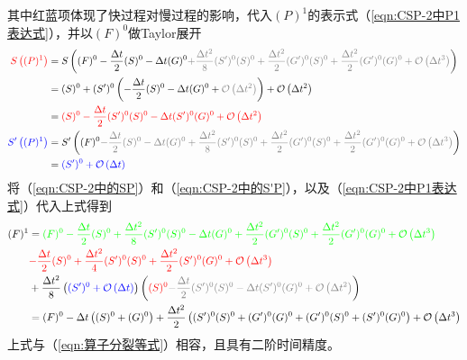 \documentclass{ctexart}
\begin{document}
其中红蓝项体现了快过程对慢过程的影响，代入$(P)^1$的表示式（\ref{eqn:CSP-2中P1表达式}），并以$(F)^0$做Taylor展开
\begin{align}
  {\color{red}S\left((P)^1\right)} & = S\left( (F)^0 - \frac{\Delta{t}}{2} (S)^0 - \Delta{t} (G)^0 {\color{gray}+ \frac{\Delta{t}^2}{8} (S^\prime)^0 (S)^0 + \frac{\Delta{t}^2}{2} (G^\prime)^0 (S)^0  + \frac{\Delta{t}^2}{2} (G^\prime)^0 (G)^0 + \mathcal{O} \left( \Delta{t}^3 \right)} \right) \nonumber \\
  & = (S)^0 + (S^\prime)^0 \left( - \frac{\Delta{t}}{2} (S)^0 - \Delta{t} (G)^0 + {\color{gray}\mathcal{O} \left( \Delta{t}^2 \right)} \right) + \mathcal{O} \left( \Delta{t}^2 \right) \nonumber \\
  & = {\color{red}(S)^0 - \frac{\Delta{t}}{2} (S^\prime)^0 (S)^0 - \Delta{t} (S^\prime)^0 (G)^0 + \mathcal{O} \left( \Delta{t}^2 \right)} \label{eqn:CSP-2中的SP} \\
  {\color{blue}S^\prime\left((P)^1\right)} & = S^\prime\left( (F)^0 {\color{gray}- \frac{\Delta{t}}{2} (S)^0 - \Delta{t} (G)^0 + \frac{\Delta{t}^2}{8} (S^\prime)^0 (S)^0 + \frac{\Delta{t}^2}{2} (G^\prime)^0 (S)^0  + \frac{\Delta{t}^2}{2} (G^\prime)^0 (G)^0 + \mathcal{O} \left( \Delta{t}^3 \right)} \right) \nonumber \\
  & = {\color{blue}(S^\prime)^0 + \mathcal{O} \left( \Delta{t} \right)} \label{eqn:CSP-2中的S'P}
\end{align}
将（\ref{eqn:CSP-2中的SP}）和（\ref{eqn:CSP-2中的S'P}），以及（\ref{eqn:CSP-2中P1表达式}）代入上式得到
\begin{align}
  (F)^1 & = {\color{green}(F)^0 - \frac{\Delta{t}}{2} (S)^0 + \frac{\Delta{t}^2}{8} (S^\prime)^0 (S)^0 - \Delta{t} (G)^0 + \frac{\Delta{t}^2}{2} (G^\prime)^0 (S)^0 + \frac{\Delta{t}^2}{2} (G^\prime)^0 (G)^0 + \mathcal{O} \left( \Delta{t}^3 \right)} \nonumber \\
  & {\color{red}- \frac{\Delta{t}}{2} (S)^0 + \frac{\Delta{t}^2}{4} (S^\prime)^0 (S)^0 + \frac{\Delta{t}^2}{2} (S^\prime)^0 (G)^0 + \mathcal{O} \left( \Delta{t}^3 \right)} \nonumber \\
  & + \frac{\Delta{t}^2}{8} \left( {\color{blue}(S^\prime)^0 + \mathcal{O} \left( \Delta{t} \right)} \right) \left( {\color{red}(S)^0} {\color{gray}- \frac{\Delta{t}}{2} (S^\prime)^0 (S)^0 - \Delta{t} (S^\prime)^0 (G)^0 + \mathcal{O} \left( \Delta{t}^2 \right)} \right) \nonumber \\
  & = (F)^0 - \Delta{t} \left( (S)^0 + (G)^0 \right) + \frac{\Delta{t}^2}{2} \left( (S^\prime)^0 (S)^0 + (G^\prime)^0 (G)^0 + (G^\prime)^0 (S)^0 + (S^\prime)^0 (G)^0 \right) + \mathcal{O} \left( \Delta{t^3} \right) \nonumber
\end{align}
上式与（\ref{eqn:算子分裂等式}）相容，且具有二阶时间精度。
\end{document}
